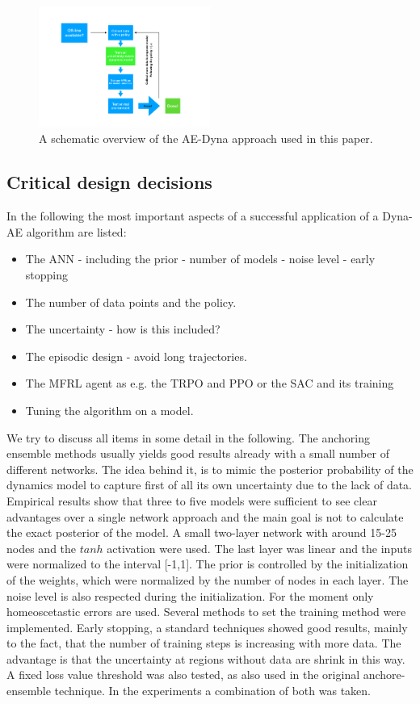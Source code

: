 \documentclass[
 reprint,
 amsmath,amssymb,amsfonts,clevref,
 aps,
prstab,
]{revtex4-2}
\begin{document}
\begin{figure}[!h]
	\centering
	\includegraphics*[width=0.5\textwidth]{Figures/MBRL_overview}
	\caption{A schematic overview of the AE-Dyna approach used in this paper.}
	\label{fig:MBRL_overview}
\end{figure}
\subsection{Critical design decisions}
In the following the most important aspects of a successful application of a Dyna-AE algorithm are listed:
\begin{itemize}
	\item The ANN - including the prior - number of models - noise level - early stopping
	\item The number of data points and the policy.
	\item The uncertainty - how is this included?
	\item The episodic design - avoid long trajectories.
	\item The MFRL agent as e.g. the TRPO and PPO or the SAC and its training
	\item Tuning the algorithm on a model.
\end{itemize}
We try to discuss all items in some detail in the following.
The anchoring ensemble methods usually yields good results already with a small number of different networks. The idea behind it, is to mimic the posterior probability of the dynamics model to capture first of all its own uncertainty due to the lack of data. Empirical results show that three to five models were sufficient to see clear advantages over a single network approach and the main goal is not to calculate the exact posterior of the model. A small two-layer network with around 15-25 nodes and the $tanh$ activation were used. The last layer was linear and the inputs were normalized to the interval [-1,1]. The prior is controlled by the initialization of the weights, which were normalized by the number of nodes in each layer. The noise level is also respected during the initialization. For the moment only homeoscetastic errors are used. Several methods to set the training method were implemented. Early stopping, a standard techniques showed good results, mainly to the fact, that the number of training steps is increasing with more data. The advantage is that the uncertainty at regions without data are shrink in this way. A fixed loss value threshold was also tested, as also used in the original anchore-ensemble technique. In the experiments a combination of both was taken.\\
\end{document}
